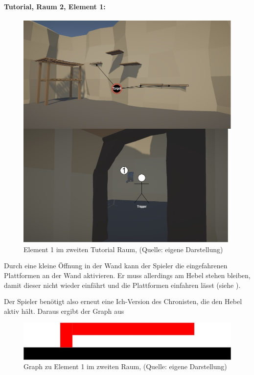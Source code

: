 \paragraph{Tutorial, Raum 2, Element 1:}

\begin{figure}[ht]
\centering
\includegraphics[width=0.8\linewidth]{content/pictures/Raetsel-L01_R02_R01.jpg}
\caption{Element 1 im zweiten Tutorial Raum, (Quelle: eigene Darstellung)}
\label{fig:L01_R02_R01}
\end{figure}

Durch eine kleine Öffnung in der Wand kann der Spieler die eingefahrenen Plattformen an der Wand aktivieren. Er muss allerdings am Hebel stehen bleiben, damit dieser nicht wieder einfährt und die Plattformen einfahren lässt (siehe ). 

Der Spieler benötigt also erneut eine Ich-Version des Chronisten, die den Hebel aktiv hält. Daraus ergibt der Graph aus 

\begin{figure}[ht]
\centering
\includegraphics[width=0.7\linewidth]{content/pictures/Raetsel-L01_R01_R01_Loesung.jpg}
\caption{Graph zu Element 1 im zweiten Raum, (Quelle: eigene Darstellung)}
\label{fig:L01_R01_R01_L_}
\end{figure}

